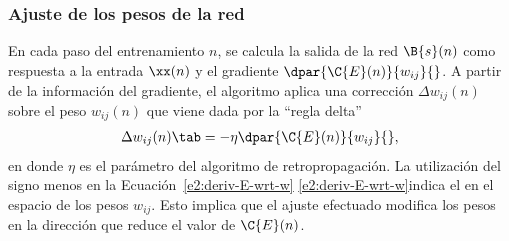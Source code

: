 %
\subsubsection{Ajuste de los pesos de la red}
%
En cada paso del entrenamiento $n$, se calcula la salida de la red
$\B{s}(n)$ como respuesta a la entrada $\xx(n)$ y el gradiente
$\dpar{\C{E}(n)}{w_{ij}}{}$. A partir de la información del gradiente,
el algoritmo aplica una corrección $\Delta{}w_{ij}(n)$ sobre el peso
$w_{ij}(n)$ que viene dada por la ``regla delta''
%
\begin{align}\label{e2:delta-rule}
  \Delta w_{ij}(n)\tab=-\eta\dpar{\C{E}(n)}{w_{ij}}{},
\end{align}
%
en donde $\eta$ es el parámetro  del
algoritmo de retropropagación. La utilización del signo menos en la
\iflatexml{}Ecuación~\ref{e2:deriv-E-wrt-w}
\else\autoref{e2:deriv-E-wrt-w}\fi indica el  en el espacio de los pesos $w_{ij}$. Esto implica que el
ajuste efectuado modifica los pesos en la dirección que reduce el
valor de $\C{E}(n)$.
